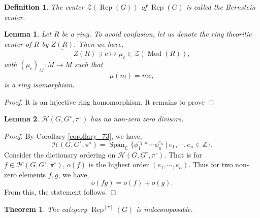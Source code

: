 \documentclass[8pt]{article}
\newtheorem{theorem}{Theorem} [section]
\newtheorem{definition}{Definition}[section]
\newtheorem{lemma}{Lemma}[section]
\DeclareMathOperator{\Rep}{Rep}
\DeclareMathOperator{\Mod}{Mod}
\DeclareMathOperator{\Span}{Span}
\newcommand{\Z}[0]{\mathbb{Z}}
\newcommand{\C}[0]{\mathbb{C}}
\newcommand{\sep}[0]{\:|\:}
\newcommand{\hecke}[0]{\mathscr{H}}
\begin{document}
\begin{definition}
  The center $\mathcal{Z}(\Rep(G))$ of $\Rep(G)$ is called the Bernstein center.
\end{definition}
\begin{lemma}
  \label{lemma_76}
  Let $R$ be a ring. To avoid confusion, let us denote the ring theoritic center of $R$ by $\underline{Z(R)}$. Then we have,
  \begin{equation*}
  \underline{Z(R)}\ni c\mapsto \mu_c\in\mathcal{Z}(\Mod(R)), 
  \end{equation*}
  with $(\mu_c)_M:M\to M$ such that 
  \begin{equation*}
    \mu(m) = mc,
  \end{equation*}
  is a ring isomorphism.
\end{lemma}
\begin{proof}
  It is an injective ring homomorphism. It remains to prove 
\end{proof}

\begin{lemma}
  $\hecke(G,G^\circ,\pi^\circ)$ has no non-zero zero divisors. 
  \label{lemma_77_1}
\end{lemma}

\begin{proof}
  By Corollary \ref{corollary_73}, we have,
  \begin{equation*}
    \hecke(G,G^\circ,\pi^\circ) = \Span_\C\{\phi_1^{e_1}\ast\cdots\phi_n^{e_n}\sep e_1,\cdots,e_n\in\Z\}.
  \end{equation*}
  Consider the dictionary ordering on $\hecke(G,G^\circ,\pi^\circ)$. That is for $f\in \hecke(G,G^\circ,\pi^\circ)$, $o(f)$ is the highest order $(e_1,\cdots,e_n)$. Thus for two non-zero elements $f,g$, we have,
  \begin{equation*}
    o(fg) = o(f)+o(g).
  \end{equation*}
  From this, the statement follows.
\end{proof}
\begin{theorem}
  \label{theorem_77}
  The category $\Rep^{[\pi]}(G)$ is indecomposable.
\end{theorem}
\end{document}
